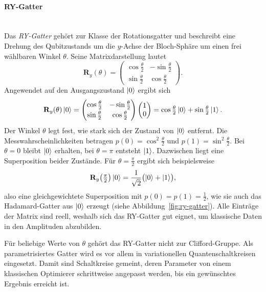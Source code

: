 \newpage

\paragraph*{RY-Gatter}\mbox{}\\
Das \textit{RY-Gatter} gehört zur Klasse der Rotationsgatter und beschreibt eine
Drehung des Qubitzustands um die $y$-Achse der Bloch-Sphäre um einen frei
wählbaren Winkel $\theta$. Seine Matrixdarstellung lautet
\begin{equation}
    \mathbf{R}_y(\theta) =
    \begin{pmatrix}
        \cos\frac{\theta}{2} & -\sin\frac{\theta}{2} \\[2pt]
        \sin\frac{\theta}{2} & \cos\frac{\theta}{2}
    \end{pmatrix}.
\end{equation}
Angewendet auf den Ausgangszustand $\ket{0}$ ergibt sich
\begin{equation}
    \mathbf{R}_y(\theta)\ket{0}
    = \begin{pmatrix}
        \cos\frac{\theta}{2} & -\sin\frac{\theta}{2} \\[2pt]
        \sin\frac{\theta}{2} & \cos\frac{\theta}{2}
      \end{pmatrix}
      \begin{pmatrix} 1 \\ 0 \end{pmatrix}
    = \cos\tfrac{\theta}{2}\ket{0} + \sin\tfrac{\theta}{2}\ket{1}.
\end{equation}
Der Winkel $\theta$ legt fest, wie stark sich der Zustand von $\ket{0}$ entfernt.
Die Messwahrscheinlichkeiten betragen $p(0) = \cos^2\tfrac{\theta}{2}$ und
$p(1) = \sin^2\tfrac{\theta}{2}$. Bei $\theta = 0$ bleibt $\ket{0}$ erhalten, bei
$\theta = \pi$ entsteht $\ket{1}$. Dazwischen liegt eine Superposition beider
Zustände. Für $\theta = \tfrac{\pi}{2}$ ergibt sich beispielsweise
\begin{equation}
    \mathbf{R}_y\!\left(\tfrac{\pi}{2}\right)\ket{0}
    = \frac{1}{\sqrt{2}}\bigl(\ket{0} + \ket{1}\bigr),
\end{equation}
also eine gleichgewichtete Superposition mit $p(0) = p(1) = \tfrac{1}{2}$, wie sie
auch das Hadamard-Gatter aus $\ket{0}$ erzeugt (siehe
Abbildung~\ref{fig:ry-gatter}). Alle Einträge der Matrix sind reell, weshalb sich
das RY-Gatter gut eignet, um klassische Daten in den Amplituden abzubilden.

Für beliebige Werte von $\theta$ gehört das RY-Gatter nicht zur Clifford-Gruppe.
Als parametrisiertes Gatter wird es vor allem in variationellen
Quantenschaltkreisen eingesetzt. Damit sind Schaltkreise gemeint, deren Parameter
von einem klassischen Optimierer schrittweise angepasst werden, bis ein
gewünschtes Ergebnis erreicht ist.

